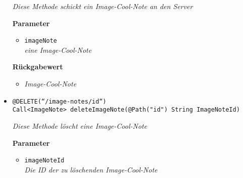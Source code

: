 \begin{itemize}
		\textit{Diese Methode schickt ein Image-Cool-Note an den Server}

		\textbf{Parameter} 
			\begin{itemize}
				\item\texttt{imageNote}\\
		 		\textit{eine Image-Cool-Note}
	 		\end{itemize}

		\textbf{Rückgabewert} 
		\begin{itemize}
		\item\textit{Image-Cool-Note}
		\end{itemize}


	     \item\texttt{{@DELETE(``/image-notes/{id}``)\\Call<ImageNote> deleteImageNote(@Path("\grqq id\grqq") String ImageNoteId)}}

		\textit{Diese Methode löscht eine Image-Cool-Note}

		\textbf{Parameter} 
			\begin{itemize}
				\item\texttt{imageNoteId}\\
		 		\textit{Die ID der zu löschenden Image-Cool-Note }
	 		\end{itemize}

	 \end{itemize}


